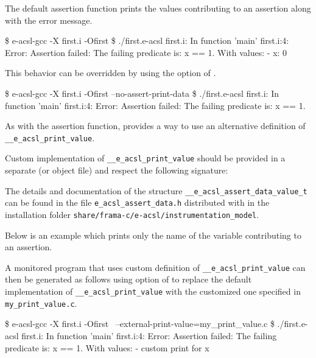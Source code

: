 The default assertion function prints the values contributing to an assertion
along with the error message.

\begin{logs}
\$ e-acsl-gcc -X first.i -Ofirst
\$ ./first.e-acsl
first.i: In function 'main'
first.i:4: Error: Assertion failed:
        The failing predicate is:
        x == 1.
        With values:
        - x: 0
\end{logs}

This behavior can be overridden by using the 
option of \eacslgcc.

\begin{logs}
  \$ e-acsl-gcc -X first.i -Ofirst --no-assert-print-data
  \$ ./first.e-acsl
  first.i: In function 'main'
  first.i:4: Error: Assertion failed:
          The failing predicate is:
          x == 1.
\end{logs}

As with the assertion function, \eacslgcc provides a way to use an alternative
definition of
\texttt{\_\_e\_acsl\_print\_value}.

Custom implementation of \texttt{\_\_e\_acsl\_print\_value}
 should be provided in a separate \C
(or object file) and respect the following signature:


The details and documentation of the structure
\texttt{\_\_e\_acsl\_assert\_data\_value\_t} can be found in the file
\texttt{e\_acsl\_assert\_data.h} distributed with \eacsl in the installation
folder \texttt{share/frama-c/e-acsl/instrumentation\_model}.

Below is an example which prints only the name of the variable contributing to
an assertion.


A monitored program that uses custom definition of
\texttt{\_\_e\_acsl\_print\_value} can then be
generated as follows using  option of \eacslgcc to
replace the default implementation of \texttt{\_\_e\_acsl\_print\_value}
 with the customized one specified in
\texttt{my\_print\_value.c}.

\begin{logs}
\$ e-acsl-gcc -X first.i -Ofirst \
    --external-print-value=my_print_value.c
\$ ./first.e-acsl
first.i: In function 'main'
first.i:4: Error: Assertion failed:
        The failing predicate is:
        x == 1.
        With values:
        - custom print for x
\end{logs}

